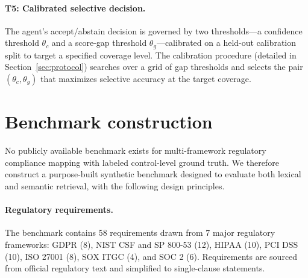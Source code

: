 \documentclass[a4paper,fleqn]{cas-sc}
\begin{document}
\paragraph{T5: Calibrated selective decision.}
The agent's accept/abstain decision is governed by two thresholds---a confidence threshold $\theta_c$ and a score-gap threshold $\theta_g$---calibrated on a held-out calibration split to target a specified coverage level.
The calibration procedure (detailed in Section~\ref{sec:protocol}) searches over a grid of gap thresholds and selects the pair $(\theta_c, \theta_g)$ that maximizes selective accuracy at the target coverage.


\section{Benchmark construction}
\label{sec:dataset}

No publicly available benchmark exists for multi-framework regulatory compliance mapping with labeled control-level ground truth.
We therefore construct a purpose-built synthetic benchmark designed to evaluate both lexical and semantic retrieval, with the following design principles.

\paragraph{Regulatory requirements.}
The benchmark contains 58 requirements drawn from 7 major regulatory frameworks: GDPR (8), NIST CSF and SP 800-53 (12), HIPAA (10), PCI DSS (10), ISO 27001 (8), SOX ITGC (4), and SOC 2 (6).
Requirements are sourced from official regulatory text and simplified to single-clause statements.
\end{document}
